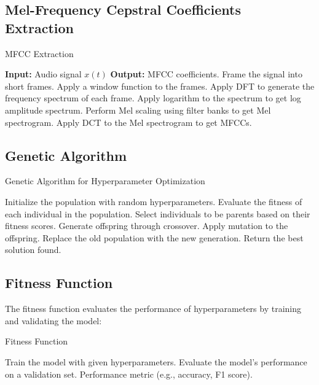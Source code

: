 \subsection{Mel-Frequency Cepstral Coefficients Extraction}

\begin{algorithm}[H]
    \caption{MFCC Extraction}
    \begin{algorithmic}[1]

        \STATE \textbf{Input:} Audio signal $x(t)$
        \STATE \textbf{Output:} MFCC coefficients.
        \STATE Frame the signal into short frames.
        \STATE Apply a window function to the frames.
        \STATE Apply DFT to generate the frequency spectrum of each frame.
        \STATE Apply logarithm to the spectrum to get log amplitude spectrum.
        \STATE Perform Mel scaling using filter banks to get Mel spectrogram.
        \STATE Apply DCT to the Mel spectrogram to get MFCCs.
    \end{algorithmic}
\end{algorithm}

\subsection{Genetic Algorithm}
\begin{algorithm}[H]
    \caption{Genetic Algorithm for Hyperparameter Optimization}
    \begin{algorithmic}[1]
        \STATE Initialize the population with random hyperparameters.
        \STATE Evaluate the fitness of each individual in the population.
        \STATE Select individuals to be parents based on their fitness scores.
        \STATE Generate offspring through crossover.
        \STATE Apply mutation to the offspring.
        \STATE Replace the old population with the new generation.
        \ENDFOR
        \STATE Return the best solution found.
    \end{algorithmic}
\end{algorithm}

\subsection{Fitness Function}
The fitness function evaluates the performance of hyperparameters by training
and validating the model:

\begin{algorithm}[H]
    \caption{Fitness Function}
    \begin{algorithmic}[1]
        \STATE Train the model with given hyperparameters.
        \STATE Evaluate the model's performance on a validation set.
        \RETURN Performance metric (e.g., accuracy, F1 score).
    \end{algorithmic}
\end{algorithm}

